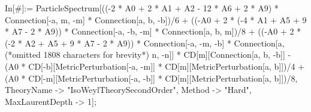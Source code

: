 In[#]:= ParticleSpectrum[((-2 * A0 + 2 * A1 + A2 - 12 * A6 + 2 * A9) * Connection[-a, m, -m] * Connection[a, b, -b])/6 + ((-A0 + 2 * (-4 * A1 + A5 + 9 * A7 - 2 * A9)) * Connection[-a, -b, -m] * Connection[a, b, m])/8 + ((-A0 + 2 * (-2 * A2 + A5 + 9 * A7 - 2 * A9)) * Connection[-a, -m, -b] * Connection[a, (*omitted 1808 characters for brevity*) n, -n]] * CD[m][Connection[a, b, -b]] - (A0 * CD[-b][MetricPerturbation[-a, -m]] * CD[m][MetricPerturbation[a, b]])/4 + (A0 * CD[-m][MetricPerturbation[-a, -b]] * CD[m][MetricPerturbation[a, b]])/8, TheoryName -> "IsoWeylTheorySecondOrder", Method -> "Hard", MaxLaurentDepth -> 1];